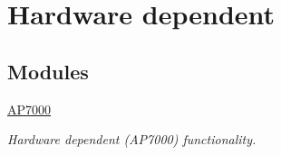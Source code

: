 \hypertarget{group___d_e_v_i_c_e___p_o_r_t_s}{
\section{Hardware dependent}
\label{group___d_e_v_i_c_e___p_o_r_t_s}
}
\subsection*{Modules}
\begin{CompactItemize}
\item 
\hyperlink{group___a_p7}{AP7000}
\begin{CompactList}\small\item\em Hardware dependent (AP7000) functionality. \item\end{CompactList}

\end{CompactItemize}
